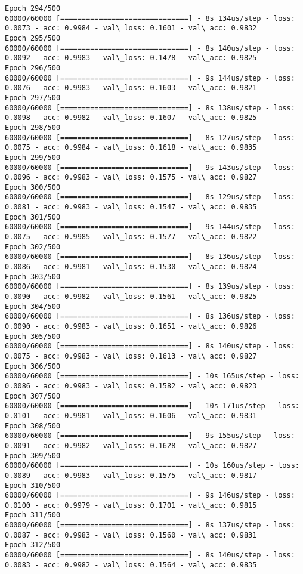 \documentclass[11pt]{article}
\begin{document}
\begin{Verbatim}[commandchars=\\\{\}]
Epoch 294/500
60000/60000 [==============================] - 8s 134us/step - loss: 0.0073 - acc: 0.9984 - val\_loss: 0.1601 - val\_acc: 0.9832
Epoch 295/500
60000/60000 [==============================] - 8s 140us/step - loss: 0.0092 - acc: 0.9983 - val\_loss: 0.1478 - val\_acc: 0.9825
Epoch 296/500
60000/60000 [==============================] - 9s 144us/step - loss: 0.0076 - acc: 0.9983 - val\_loss: 0.1603 - val\_acc: 0.9821
Epoch 297/500
60000/60000 [==============================] - 8s 138us/step - loss: 0.0098 - acc: 0.9982 - val\_loss: 0.1607 - val\_acc: 0.9825
Epoch 298/500
60000/60000 [==============================] - 8s 127us/step - loss: 0.0075 - acc: 0.9984 - val\_loss: 0.1618 - val\_acc: 0.9835
Epoch 299/500
60000/60000 [==============================] - 9s 143us/step - loss: 0.0096 - acc: 0.9983 - val\_loss: 0.1575 - val\_acc: 0.9827
Epoch 300/500
60000/60000 [==============================] - 8s 129us/step - loss: 0.0081 - acc: 0.9983 - val\_loss: 0.1547 - val\_acc: 0.9835
Epoch 301/500
60000/60000 [==============================] - 9s 144us/step - loss: 0.0075 - acc: 0.9985 - val\_loss: 0.1577 - val\_acc: 0.9822
Epoch 302/500
60000/60000 [==============================] - 8s 136us/step - loss: 0.0086 - acc: 0.9981 - val\_loss: 0.1530 - val\_acc: 0.9824
Epoch 303/500
60000/60000 [==============================] - 8s 139us/step - loss: 0.0090 - acc: 0.9982 - val\_loss: 0.1561 - val\_acc: 0.9825
Epoch 304/500
60000/60000 [==============================] - 8s 136us/step - loss: 0.0090 - acc: 0.9983 - val\_loss: 0.1651 - val\_acc: 0.9826
Epoch 305/500
60000/60000 [==============================] - 8s 140us/step - loss: 0.0075 - acc: 0.9983 - val\_loss: 0.1613 - val\_acc: 0.9827
Epoch 306/500
60000/60000 [==============================] - 10s 165us/step - loss: 0.0086 - acc: 0.9983 - val\_loss: 0.1582 - val\_acc: 0.9823
Epoch 307/500
60000/60000 [==============================] - 10s 171us/step - loss: 0.0101 - acc: 0.9981 - val\_loss: 0.1606 - val\_acc: 0.9831
Epoch 308/500
60000/60000 [==============================] - 9s 155us/step - loss: 0.0091 - acc: 0.9982 - val\_loss: 0.1628 - val\_acc: 0.9827
Epoch 309/500
60000/60000 [==============================] - 10s 160us/step - loss: 0.0089 - acc: 0.9983 - val\_loss: 0.1575 - val\_acc: 0.9817
Epoch 310/500
60000/60000 [==============================] - 9s 146us/step - loss: 0.0100 - acc: 0.9979 - val\_loss: 0.1701 - val\_acc: 0.9815
Epoch 311/500
60000/60000 [==============================] - 8s 137us/step - loss: 0.0087 - acc: 0.9983 - val\_loss: 0.1560 - val\_acc: 0.9831
Epoch 312/500
60000/60000 [==============================] - 8s 140us/step - loss: 0.0083 - acc: 0.9982 - val\_loss: 0.1564 - val\_acc: 0.9835

\end{Verbatim}
\end{document}
